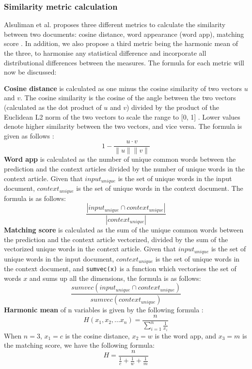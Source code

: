 \documentclass{article}
\begin{document}
\subsubsection{Similarity metric calculation} \label{section:similarity-metric}
Alsuliman et al. proposes three different metrics to calculate the similarity between two documents: cosine distance, word appearance (word app), matching score \cite{alsuliman2022social}. In addition, we also propose a third metric being the harmonic mean of the three, to harmonise any statistical difference and incorporate all distributional differences between the measures. The formula for each metric will now be discussed:

\noindent \textbf{Cosine distance} is calculated as one minus the cosine similarity of two vectors $u$ and $v$. The cosine similarity is the cosine of the angle between the two vectors (calculated as the dot product of $u$ and $v$) divided by the product of the Euclidean L2 norm of the two vectors to scale the range to [0, 1] \cite{scikit-learn}. Lower values denote higher similarity between the two vectors, and vice versa. The formula is given as follows \cite{scipy}:
\[ 1 - \frac{u \cdot v}{\lVert u \rVert \lVert v \rVert}\]
\textbf{Word app} is calculated as the number of unique common words between the prediction and the context articles divided by the number of unique words in the context article. Given that \texttt{$input_{unique}$} is the set of unique words in the input document, \texttt{$context_{unique}$} is the set of unique words in the context document. The formula is as follows:
\[\frac{\left|input_{unique} \cap context_{unique}\right|}{\left|context_{unique}\right|}\]
\textbf{Matching score} is calculated as the sum of the unique common words between the prediction and the context article vectorized, divided by the sum of the vectorized unique words in the context article. Given that \texttt{$input_{unique}$} is the set of unique words in the input document, \texttt{$context_{unique}$} is the set of unique words in the context document, and \texttt{sumvec(x)} is a function which vectorises the set of words $x$ and sums up all the dimensions, the formula is as follows:
\[\frac{sumvec(input_{unique} \cap context_{unique})}{sumvec(context_{unique})}\]
\textbf{Harmonic mean} of n variables is given by the following formula \cite{harmonic_mean}:
\[H(x_1, x_2, ... x_n) = \frac{n}{\sum^n_{i=1}\frac{1}{x_i}}\]
When $n = 3$, $x_1 = c$ is the cosine distance, $x_2 = w$ is the word app, and $x_3 = m$ is the matching score, we have the following formula:
\[H = \frac{n}{\frac{1}{c} + \frac{1}{w} + \frac{1}{m}}\]
\end{document}

